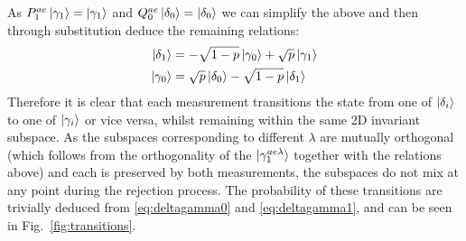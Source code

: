\documentclass[aps,floatfix,10pt,amssymb,amsfont,amsmath,superscriptaddress,float,nofootinbib,longbibliography,nobalancelastpage,twocolumn]{revtex4-2}
\begin{document}
As $P^{ae}_1 \ket{\gamma_1} = \ket{\gamma_1}$ and $Q^{ae}_0\ket{\delta_0} = \ket{\delta_0}$ we can simplify the above and then through substitution deduce the remaining relations:
\begin{align}
\begin{split}
\label{eq:deltagamma1}
        \ket{\delta_1} &= -\sqrt{1-p} \ket{\gamma_0} + \sqrt{p} \ket{\gamma_1}\\
    \ket{\gamma_0} &= \sqrt{p} \ket{\delta_0} - \sqrt{1-p}\ket{\delta_1}
\end{split}
\end{align}
Therefore it is clear that each measurement transitions the state from one of $\ket{\delta_i}$ to one of $\ket{\gamma_i}$ or vice versa, whilst remaining within the same 2D invariant subspace. As the subspaces corresponding to different $\lambda$ are mutually orthogonal (which follows from the orthogonality of the $\ket{\gamma^{ae\lambda}_1}$ together with the relations above) and each is preserved by both measurements, the subspaces do not mix at any point during the rejection process. The probability of these transitions are trivially deduced from \eqref{eq:deltagamma0} and \eqref{eq:deltagamma1}, and can be seen in Fig.~\ref{fig:transitions}.
\end{document}
